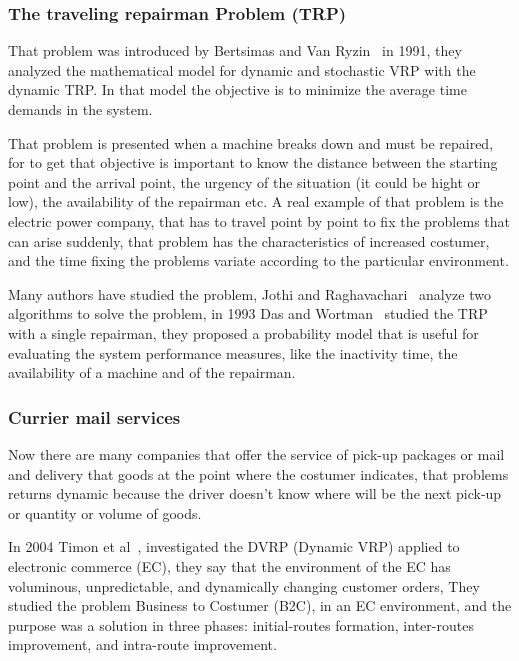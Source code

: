 \subsubsection*{The traveling repairman Problem (TRP)} 

That problem was introduced by Bertsimas and Van Ryzin~\cite{bertsimas_stochastic_1991} in 1991, they analyzed the mathematical model for dynamic and stochastic VRP with the dynamic TRP. In that model the objective is to minimize the average time demands in the system. 

That problem is presented when a machine breaks down and must be repaired, for to get that objective is important  to know the distance between the starting point and the arrival point, the urgency of the situation (it could be hight or low), the availability of the repairman etc. A real example of that problem is the electric power company, that has to travel point by point  to fix the problems that can arise suddenly, that problem has the characteristics of increased costumer, and the time fixing the problems variate according to the particular environment.

Many authors have studied the problem, Jothi and Raghavachari~\cite{jothi_approximatingk-traveling_2007} analyze two algorithms to solve the problem, in 1993 Das and Wortman~\cite{Tapas} studied the TRP with a single repairman, they  proposed a probability model that is useful for evaluating the system performance measures, like the inactivity time, the availability of a machine and of the repairman.  

\subsubsection*{Currier mail services} 

Now there are many companies that offer the service of pick-up packages or mail and delivery that goods at the point where the costumer indicates, that problems returns dynamic because the driver doesn't know where will be the next pick-up or quantity or volume of goods.

In 2004 Timon et al~\cite{Timon}, investigated the DVRP (Dynamic VRP) applied to electronic commerce (EC), they say that the  environment of the EC has voluminous, unpredictable, and dynamically changing customer orders, They studied the problem Business to Costumer (B2C), in an EC environment, and the purpose was a solution in three phases: initial-routes formation, inter-routes improvement, and intra-route improvement. 

